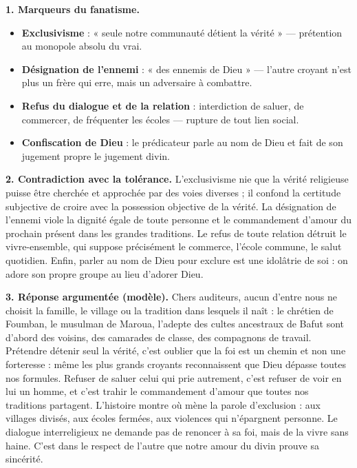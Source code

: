 \documentclass[11pt]{article}
\begin{document}
\begin{corrige}
\textbf{1. Marqueurs du fanatisme.}
\begin{itemize}
\item \textbf{Exclusivisme} : « seule notre communauté détient la vérité » — prétention au monopole absolu du vrai.
\item \textbf{Désignation de l'ennemi} : « des ennemis de Dieu » — l'autre croyant n'est plus un frère qui erre, mais un adversaire à combattre.
\item \textbf{Refus du dialogue et de la relation} : interdiction de saluer, de commercer, de fréquenter les écoles — rupture de tout lien social.
\item \textbf{Confiscation de Dieu} : le prédicateur parle au nom de Dieu et fait de son jugement propre le jugement divin.
\end{itemize}

\textbf{2. Contradiction avec la tolérance.} L'exclusivisme nie que la vérité religieuse puisse être cherchée et approchée par des voies diverses ; il confond la certitude subjective de croire avec la possession objective de la vérité. La désignation de l'ennemi viole la dignité égale de toute personne et le commandement d'amour du prochain présent dans les grandes traditions. Le refus de toute relation détruit le vivre-ensemble, qui suppose précisément le commerce, l'école commune, le salut quotidien. Enfin, parler au nom de Dieu pour exclure est une idolâtrie de soi : on adore son propre groupe au lieu d'adorer Dieu.

\textbf{3. Réponse argumentée (modèle).} Chers auditeurs, aucun d'entre nous ne choisit la famille, le village ou la tradition dans lesquels il naît : le chrétien de Foumban, le musulman de Maroua, l'adepte des cultes ancestraux de Bafut sont d'abord des voisins, des camarades de classe, des compagnons de travail. Prétendre détenir seul la vérité, c'est oublier que la foi est un chemin et non une forteresse : même les plus grands croyants reconnaissent que Dieu dépasse toutes nos formules. Refuser de saluer celui qui prie autrement, c'est refuser de voir en lui un homme, et c'est trahir le commandement d'amour que toutes nos traditions partagent. L'histoire montre où mène la parole d'exclusion : aux villages divisés, aux écoles fermées, aux violences qui n'épargnent personne. Le dialogue interreligieux ne demande pas de renoncer à sa foi, mais de la vivre sans haine. C'est dans le respect de l'autre que notre amour du divin prouve sa sincérité.
\end{corrige}
\end{document}
